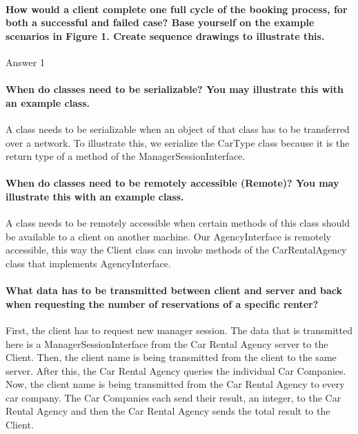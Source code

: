 \documentclass{ds-report}
\begin{document}
	\maketitle

	\paragraph{How would a client complete one full cycle of the booking process, for both a successful and
failed case? Base yourself on the example scenarios in Figure 1. Create sequence drawings to
illustrate this.\\} 
	Answer 1
	
	\paragraph{When do classes need to be serializable? You may illustrate this with an example class.\\} 
	A class needs to be serializable when an object of that class has to be transferred over a network. To illustrate this, we serialize the CarType class because it is the return type of a method of the ManagerSessionInterface.
	
	\paragraph{When do classes need to be remotely accessible (Remote)? You may illustrate this with  an example class.\\} 
	A class needs to be remotely accessible when certain methods of this class should be available to a client on another machine.
	Our AgencyInterface is remotely accessible, this way the Client class can invoke methods of the CarRentalAgency class that implements AgencyInterface.
	
	\paragraph{What data has to be transmitted between client and server and back when requesting the number
of reservations of a specific renter?\\}
	First, the client has to request new manager session.
	The data that is transmitted here is a ManagerSessionInterface from the Car Rental Agency server to the Client.
	Then, the client name is being transmitted from the client to the same server.
	After this, the Car Rental Agency queries the individual Car Companies. Now, the client name is being transmitted from the Car Rental Agency to every car company.
	The Car Companies each send their result, an integer, to the Car Rental Agency and then the Car Rental Agency sends the total result to the Client.
	
\end{document}

